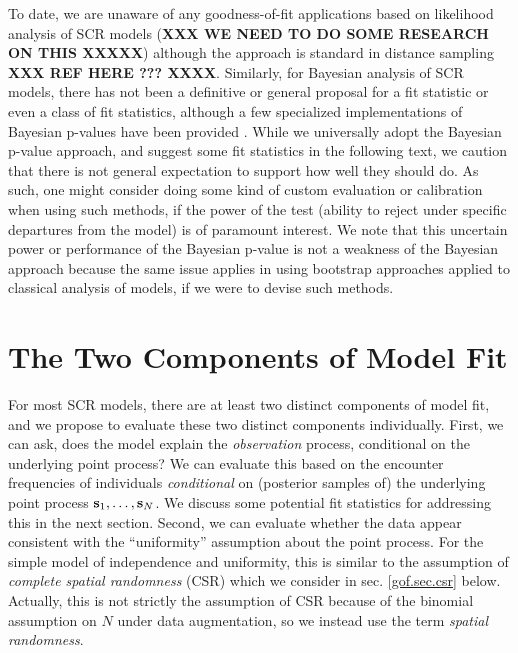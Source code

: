 To date, we are unaware of any goodness-of-fit applications based on
likelihood analysis of SCR models ({\bf XXX WE NEED TO DO SOME
  RESEARCH ON THIS XXXXX}) although the approach is standard in
distance sampling {\bf XXX REF HERE ??? XXXX}.  Similarly, for
Bayesian analysis of SCR models, there has not been a definitive or
general proposal for a fit statistic or even a class of fit
statistics, although a few specialized implementations of Bayesian
p-values have been provided \citep{royle:2009,royle_etal:2011mee,
  gopalaswamy_etal:2012ecol,gopalaswamy_etal:2012mee,russell_etal:2012}.
While we universally adopt the Bayesian p-value approach, and suggest
some fit statistics in the following text, we caution that there is
not general expectation to support how well they should do.
As such, one might consider doing some kind of custom
evaluation or calibration when using such methods, if the power of the
test (ability to reject under specific departures from the model) is
of paramount interest.  We note that this uncertain power or
performance of the Bayesian p-value is not a weakness of the Bayesian
approach because the same issue applies in using bootstrap approaches
applied to classical analysis of models, if we were to devise such
methods.



\section{The Two Components of Model Fit}

For most SCR models, there are at least two distinct components of
model fit, and we propose to evaluate these two distinct components
 individually.  First, we can ask, does the model explain the {\it
  observation} process, conditional on the underlying point process?
We can evaluate this based on the encounter frequencies of individuals
{\it conditional} on (posterior samples of) the underlying point
process ${\bf s}_{1}, \ldots, {\bf s}_{N}$.  We discuss some potential
fit statistics for addressing this in the next section.  Second, we
can evaluate whether the data appear consistent with the
``uniformity'' assumption about the point process.  For the simple
model of independence and uniformity, this is similar to the
assumption of {\it complete spatial randomness} (CSR) which we
consider in sec. \ref{gof.sec.csr} below. Actually, this is not
strictly the assumption of CSR because of the binomial assumption on
$N$ under data augmentation, so we instead use the term {\it spatial
  randomness}.


